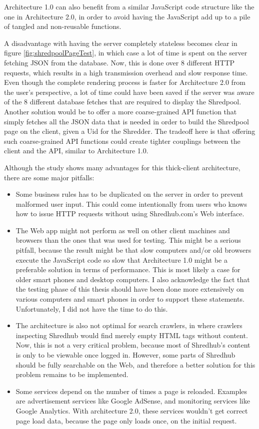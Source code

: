 Architecture 1.0 can also benefit from a similar JavaScript code structure like the one in Architecture 2.0, in order to avoid having the JavaScript add up to a pile of tangled and non-reusable functions. 

A disadvantage with having the server completely stateless becomes clear in figure \vref{fig:shredpoolPageTest}, in which case a lot of time is spent on the server fetching JSON from the database. Now, this is done over 8 different HTTP requests, which results in a high transmission overhead and slow response time. Even though the complete rendering process is faster for Architecture 2.0 from the user's perspective, a lot of time could have been saved if the server was aware of the 8 different database fetches that are required to display the Shredpool. Another solution would be to offer a more coarse-grained API function that simply fetches all the JSON data that is needed in order to build the Shredpool page on the client, given a Uid for the Shredder. The tradeoff here is that offering such coarse-grained API functions could  create tighter couplings between the client and the API, similar to Architecture 1.0.

Although the study shows many advantages for this thick-client architecture, there are some major pitfalls:
\begin{itemize}
\item{} Some business rules has to be duplicated on the server in order to prevent malformed user input. This could come intentionally from users who knows how to issue HTTP requests without using Shredhub.com's Web interface. 
\item{} The Web app might not perform as well on other client machines and browsers than the ones that was used for testing. This might be a serious pitfall, because the result might be that slow computers and/or old browsers execute the JavaScript code so slow that Architecture 1.0 might be a preferable solution in terms of performance. This is most likely a case for older smart phones and desktop computers. I also acknowledge the fact that the testing phase of this thesis should have been done more extensively on various computers and smart phones in order to support these statements. Unfortunately, I did not have the time to do this.
\item{} The architecture is also not optimal for search crawlers, in where crawlers inspecting Shredhub would find merely empty HTML tags without content. Now, this is not a very critical problem, because most of Shredhub's content is only to be viewable once logged in. However, some parts of Shredhub should be fully searchable on the Web, and therefore a better solution for this problem remains to be implemented.
\item{} Some services depend on the number of times a page is reloaded. Examples are advertisement services like Google AdSense\cite{google-ad}, and monitoring services like Google Analytics\cite{google-an}. With architecture 2.0, these services wouldn't get correct page load data, because the page only loads once, on the initial request. 
\end{itemize}

